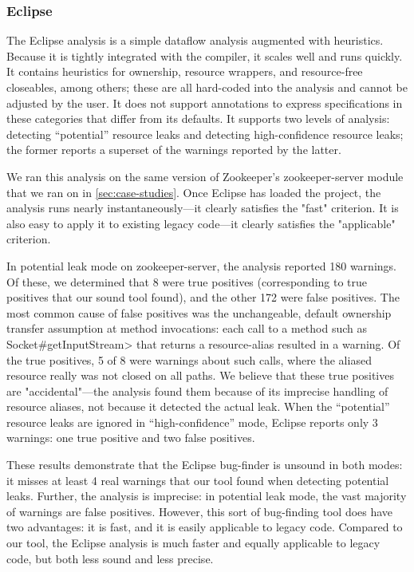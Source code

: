 \subsubsection{Eclipse}
\label{sec:eclipse}

The Eclipse analysis is a simple dataflow analysis
augmented with heuristics. Because it is tightly integrated with
the compiler, it scales well and runs quickly. It contains
heuristics for ownership, resource wrappers, and resource-free
closeables, among others; these are all hard-coded into the analysis and cannot
be adjusted by the user. It does not support annotations to express
specifications in these categories that differ from its defaults.
It supports two levels of analysis: detecting ``potential'' resource
leaks and detecting high-confidence resource leaks; the former reports a superset
of the warnings reported by the latter.

We ran this analysis on the same version of Zookeeper's zookeeper-server
module that we ran \tool on in \cref{sec:case-studies}. Once Eclipse
has loaded the project, the analysis runs nearly instantaneously---it
clearly satisfies the "fast" criterion. It is also easy to apply it to
existing legacy code---it clearly satisfies the "applicable" criterion.

In potential leak mode on zookeeper-server, the analysis reported 180
warnings.  Of these, we determined that 8 were true positives
(corresponding to true positives that our sound tool found), and the
other 172 were false positives.  The most common cause of false
positives was the unchangeable, default ownership transfer assumption
at method invocations: each call to a method such as
\<Socket\#getInputStream> that returns a resource-alias resulted in a
warning.  Of the true positives, 5 of 8 were warnings about such
calls, where the aliased resource really was not closed on all
paths. We believe that these true positives are "accidental"---the
analysis found them because of its imprecise handling of resource
aliases, not because it detected the actual leak. When the
``potential'' resource leaks are ignored in ``high-confidence'' mode,
Eclipse reports only 3 warnings: one true positive and two false
positives.

These results demonstrate that the Eclipse bug-finder is unsound in both
modes: it misses at least 4 real warnings that our tool found when detecting
potential leaks. Further, the analysis is imprecise: in potential leak mode,
the vast majority of warnings are false positives. However, this sort
of bug-finding tool does have two advantages: it is fast, and it is easily
applicable to legacy code. Compared to our tool, the Eclipse analysis
is much faster and equally applicable to legacy code, but both less sound
and less precise.

